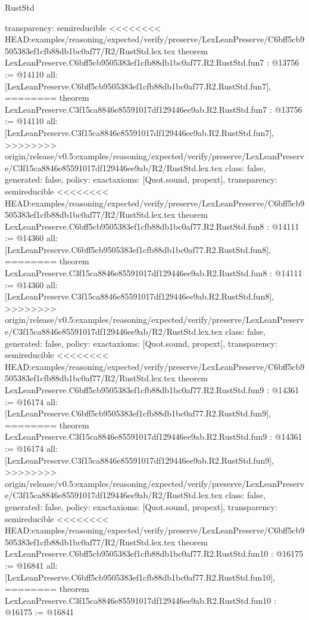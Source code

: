 \begin{lexlean}{RustStd}
\begin{coremodule}
{\begin{coremodule}
{{{{{{{{{{  transparency: semireducible
}
<<<<<<<< HEAD:examples/reasoning/expected/verify/preserve/LexLeanPreserve/C6bff5cb9505383ef1cfb88db1bc0af77/R2/RustStd.lex.tex
theorem LexLeanPreserve.C6bff5cb9505383ef1cfb88db1bc0af77.R2.RustStd.fun7 : @13756 := @14110 {
  all: [LexLeanPreserve.C6bff5cb9505383ef1cfb88db1bc0af77.R2.RustStd.fun7],
========
theorem LexLeanPreserve.C3f15ca8846e85591017df129446ee9ab.R2.RustStd.fun7 : @13756 := @14110 {
  all: [LexLeanPreserve.C3f15ca8846e85591017df129446ee9ab.R2.RustStd.fun7],
>>>>>>>> origin/release/v0.5:examples/reasoning/expected/verify/preserve/LexLeanPreserve/C3f15ca8846e85591017df129446ee9ab/R2/RustStd.lex.tex
  class: false,
  generated: false,
  policy: exact{axioms: [Quot.sound, propext]},
  transparency: semireducible
}
<<<<<<<< HEAD:examples/reasoning/expected/verify/preserve/LexLeanPreserve/C6bff5cb9505383ef1cfb88db1bc0af77/R2/RustStd.lex.tex
theorem LexLeanPreserve.C6bff5cb9505383ef1cfb88db1bc0af77.R2.RustStd.fun8 : @14111 := @14360 {
  all: [LexLeanPreserve.C6bff5cb9505383ef1cfb88db1bc0af77.R2.RustStd.fun8],
========
theorem LexLeanPreserve.C3f15ca8846e85591017df129446ee9ab.R2.RustStd.fun8 : @14111 := @14360 {
  all: [LexLeanPreserve.C3f15ca8846e85591017df129446ee9ab.R2.RustStd.fun8],
>>>>>>>> origin/release/v0.5:examples/reasoning/expected/verify/preserve/LexLeanPreserve/C3f15ca8846e85591017df129446ee9ab/R2/RustStd.lex.tex
  class: false,
  generated: false,
  policy: exact{axioms: [Quot.sound, propext]},
  transparency: semireducible
}
<<<<<<<< HEAD:examples/reasoning/expected/verify/preserve/LexLeanPreserve/C6bff5cb9505383ef1cfb88db1bc0af77/R2/RustStd.lex.tex
theorem LexLeanPreserve.C6bff5cb9505383ef1cfb88db1bc0af77.R2.RustStd.fun9 : @14361 := @16174 {
  all: [LexLeanPreserve.C6bff5cb9505383ef1cfb88db1bc0af77.R2.RustStd.fun9],
========
theorem LexLeanPreserve.C3f15ca8846e85591017df129446ee9ab.R2.RustStd.fun9 : @14361 := @16174 {
  all: [LexLeanPreserve.C3f15ca8846e85591017df129446ee9ab.R2.RustStd.fun9],
>>>>>>>> origin/release/v0.5:examples/reasoning/expected/verify/preserve/LexLeanPreserve/C3f15ca8846e85591017df129446ee9ab/R2/RustStd.lex.tex
  class: false,
  generated: false,
  policy: exact{axioms: [Quot.sound, propext]},
  transparency: semireducible
}
<<<<<<<< HEAD:examples/reasoning/expected/verify/preserve/LexLeanPreserve/C6bff5cb9505383ef1cfb88db1bc0af77/R2/RustStd.lex.tex
theorem LexLeanPreserve.C6bff5cb9505383ef1cfb88db1bc0af77.R2.RustStd.fun10 : @16175 := @16841 {
  all: [LexLeanPreserve.C6bff5cb9505383ef1cfb88db1bc0af77.R2.RustStd.fun10],
========
theorem LexLeanPreserve.C3f15ca8846e85591017df129446ee9ab.R2.RustStd.fun10 : @16175 := @16841 {
}}}}}}}}}}}}}}
\end{coremodule}}
\end{coremodule}
\end{lexlean}
